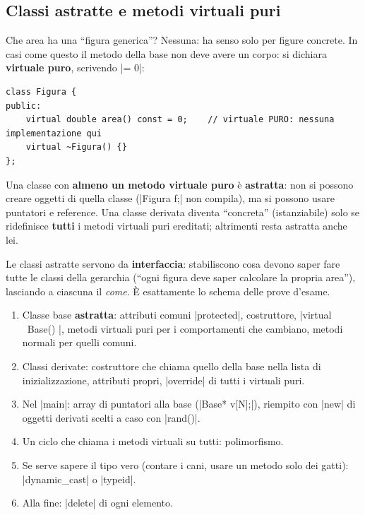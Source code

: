 \subsection*{Classi astratte e metodi virtuali puri}

Che area ha una ``figura generica''? Nessuna: ha senso solo per figure concrete.
In casi come questo il metodo della base non deve avere un corpo: si dichiara
\textbf{virtuale puro}, scrivendo \cc|= 0|:
\begin{lstlisting}
class Figura {
public:
    virtual double area() const = 0;    // virtuale PURO: nessuna implementazione qui
    virtual ~Figura() {}
};
\end{lstlisting}

\begin{definizione}
Una classe con \textbf{almeno un metodo virtuale puro} è \textbf{astratta}: non si
possono creare oggetti di quella classe (\cc|Figura f;| non compila), ma si possono
usare puntatori e reference. Una classe derivata diventa ``concreta'' (istanziabile)
solo se ridefinisce \textbf{tutti} i metodi virtuali puri ereditati; altrimenti resta
astratta anche lei.
\end{definizione}

Le classi astratte servono da \textbf{interfaccia}: stabiliscono cosa devono saper fare
tutte le classi della gerarchia (``ogni figura deve saper calcolare la propria area''),
lasciando a ciascuna il \emph{come}. È esattamente lo schema delle prove d'esame.

\begin{passopasso}
\begin{enumerate}
  \item Classe base \textbf{astratta}: attributi comuni \cc|protected|, costruttore,
        \cc|virtual ~Base() {}|, metodi virtuali puri per i comportamenti che cambiano,
        metodi normali per quelli comuni.
  \item Classi derivate: costruttore che chiama quello della base nella lista di
        inizializzazione, attributi propri, \cc|override| di tutti i virtuali puri.
  \item Nel \cc|main|: array di puntatori alla base (\cc|Base* v[N];|), riempito con
        \cc|new| di oggetti derivati scelti a caso con \cc|rand()|.
  \item Un ciclo che chiama i metodi virtuali su tutti: polimorfismo.
  \item Se serve sapere il tipo vero (contare i cani, usare un metodo solo dei gatti):
        \cc|dynamic_cast| o \cc|typeid|.
  \item Alla fine: \cc|delete| di ogni elemento.
\end{enumerate}
\end{passopasso}

